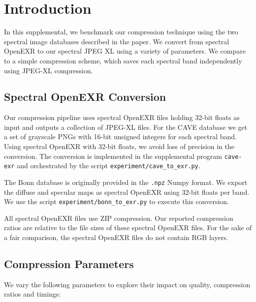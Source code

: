 \section{Introduction}

In this supplemental, we benchmark our compression technique using the two spectral image databases described in the paper.
We convert from spectral OpenEXR to our spectral JPEG XL using a variety of parameters.
We compare to a simple compression scheme, which saves each spectral band independently using JPEG-XL compression.


\subsection{Spectral OpenEXR Conversion}

Our compression pipeline uses spectral OpenEXR files holding 32-bit floats as input and outputs a collection of JPEG-XL files.
For the CAVE database we get a set of grayscale PNGs with 16-bit unsigned integers for each spectral band.
Using spectral OpenEXR with 32-bit floats, we avoid loss of precision in the conversion.
The conversion is implemented in the supplemental program \verb?cave-exr? and orchestrated by the script \verb?experiment/cave_to_exr.py?.

The Bonn database is originally provided in the \verb?.npz? Numpy format.
We export the diffuse and specular maps as spectral OpenEXR using 32-bit floats per band.
We use the script \verb?experiment/bonn_to_exr.py? to execute this conversion.

All spectral OpenEXR files use ZIP compression.
Our reported compression ratios are relative to the file sizes of these spectral OpenEXR files.
For the sake of a fair comparison, the spectral OpenEXR files do not contain RGB layers.


\subsection{Compression Parameters}

We vary the following parameters to explore their impact on quality, compression ratios and timings:

